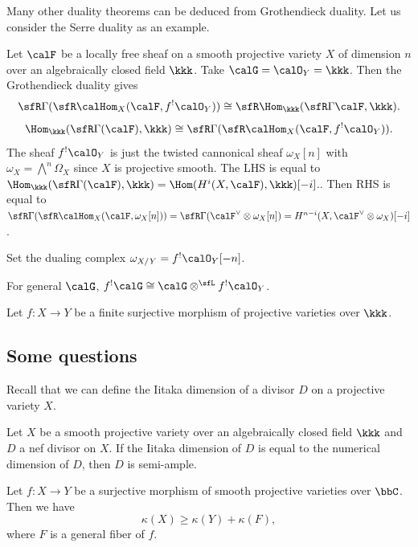 Many other duality theorems can be deduced from Grothendieck duality.
Let us consider the Serre duality as an example.

\begin{example}
	Let $\calF$ be a locally free sheaf on a smooth projective variety $X$ of dimension $n$ over an algebraically closed field $\kkk$.
	Take $\calG = \calO_Y = \kkk$.
	Then the Grothendieck duality gives
	\[ \sfR \Gamma(\sfR \calHom_X(\calF, f^!\calO_Y)) \cong \sfR \Hom_\kkk(\sfR \Gamma \calF, \kkk). \]
	\[ \Hom_\kkk(\sfR \Gamma(\calF), \kkk) \cong \sfR \Gamma(\sfR \calHom_X(\calF, f^!\calO_Y)). \]
	The sheaf $f^!\calO_Y$ is just the twisted cannonical sheaf $\omega_X[n]$ with $\omega_X = \bigwedge^n \Omega_X$ since $X$ is projective smooth.
	The LHS is equal to $\Hom_\kkk(\sfR \Gamma(\calF), \kkk) = \Hom(H^i(X, \calF), \kkk)[-i]$.\Yang{}.
	Then RHS is equal to $\sfR \Gamma(\sfR \calHom_X(\calF, \omega_X[n])) = \sfR \Gamma(\calF^\vee\otimes \omega_X[n]) = H^{n-i}(X, \calF^\vee\otimes \omega_X)[-i]$.\Yang{}
\end{example}

Set the dualing complex $\omega_{X/Y} = f^!\calO_Y[-n]$.

For general $\calG$, $f^! \calG \cong \calG \otimes^\sfL f^!\calO_Y$.


Let $f: X \to Y$ be a finite surjective morphism of projective varieties over $\kkk$.






\subsection{Some questions}

Recall that we can define the Iitaka dimension of a divisor $D$ on a projective variety $X$.

\begin{conjecture}
	Let $X$ be a smooth projective variety over an algebraically closed field $\kkk$ and $D$ a nef divisor on $X$.
	If the Iitaka dimension of $D$ is equal to the numerical dimension of $D$, then $D$ is semi-ample.
	\Yang{}
\end{conjecture}


\begin{conjecture}
	Let $f:X\to Y$ be a surjective morphism of smooth projective varieties over $\bbC$.
	Then we have
	\[ \kappa(X) \ge \kappa(Y) + \kappa(F), \]
	where $F$ is a general fiber of $f$.
	\Yang{}

\end{conjecture}

